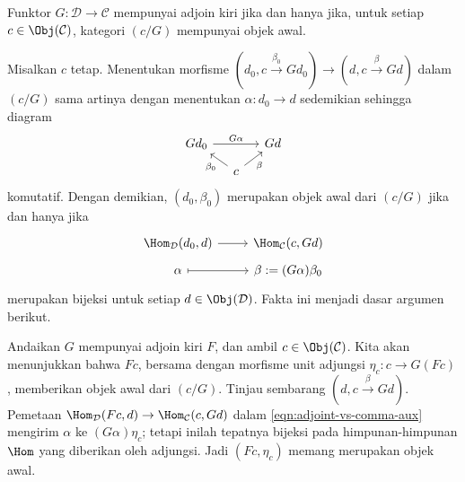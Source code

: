\begin{lema}\label{prop:adjoint-vs-comma}
	Funktor $G:\mathcal{D}\to\mathcal{C}$ mempunyai adjoin kiri jika dan
	hanya jika, untuk setiap $c\in\Obj(\mathcal{C})$, kategori $(c/G)$
	mempunyai objek awal.
\end{lema}
\begin{bukti}
	Misalkan $c$ tetap. Menentukan morfisme
	$(d_0,c\xrightarrow{\beta_0}Gd_0)\to
	(d,c\xrightarrow{\beta}Gd)$ dalam $(c/G)$ sama artinya dengan menentukan
	$\alpha:d_0\to d$ sedemikian sehingga diagram
	\[\begin{tikzcd}[row sep=small, column sep=small]
		Gd_0 \arrow[rr, "G\alpha"] & & Gd \\
		& c \arrow[lu, "\beta_0"] \arrow[ru, "\beta"'] &
	\end{tikzcd}\]
	komutatif. Dengan demikian, $(d_0,\beta_0)$ merupakan objek awal dari
	$(c/G)$ jika dan hanya jika
	\begin{equation}\label{eqn:adjoint-vs-comma-aux}
	\begin{tikzcd}[row sep=tiny]
		\Hom_{\mathcal{D}}(d_0, d) \arrow[r] & \Hom_{\mathcal{C}}(c, Gd) \\
		\alpha \arrow[mapsto, r] & \beta := (G\alpha) \beta_0
	\end{tikzcd}\end{equation}
	merupakan bijeksi untuk setiap $d\in\Obj(\mathcal{D})$. Fakta ini menjadi
	dasar argumen berikut.

	Andaikan $G$ mempunyai adjoin kiri $F$, dan ambil
	$c\in\Obj(\mathcal{C})$. Kita akan menunjukkan bahwa $Fc$, bersama dengan
	morfisme unit adjungsi $\eta_c:c\to G(Fc)$, memberikan objek awal dari
	$(c/G)$. Tinjau sembarang $(d,c\xrightarrow{\beta}Gd)$. Pemetaan
	$\Hom_{\mathcal{D}}(Fc,d)\to\Hom_{\mathcal{C}}(c,Gd)$ dalam
	\eqref{eqn:adjoint-vs-comma-aux} mengirim $\alpha$ ke
	$(G\alpha)\eta_c$; tetapi inilah tepatnya bijeksi pada himpunan-himpunan
	$\Hom$ yang diberikan oleh adjungsi. Jadi $(Fc,\eta_c)$ memang merupakan
	objek awal.


\end{bukti}
